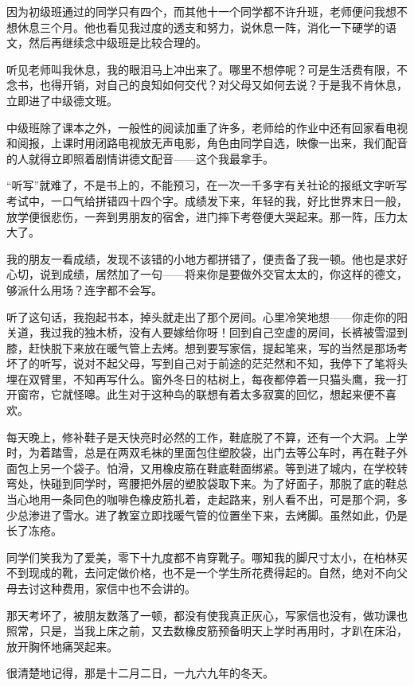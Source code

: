 \par 因为初级班通过的同学只有四个，而其他十一个同学都不许升班，老师便问我想不想休息三个月。他也看见我过度的透支和努力，说休息一阵，消化一下硬学的语文，然后再继续念中级班是比较合理的。
\par 听见老师叫我休息，我的眼泪马上冲出来了。哪里不想停呢？可是生活费有限，不念书，也得开销，对自己的良知如何交代？对父母又如何去说？于是我不肯休息，立即进了中级德文班。
\par 中级班除了课本之外，一般性的阅读加重了许多，老师给的作业中还有回家看电视和阅报，上课时用闭路电视放无声电影，角色由同学自选，映像一出来，我们配音的人就得立即照着剧情讲德文配音——这个我最拿手。
\par “听写”就难了，不是书上的，不能预习，在一次一千多字有关社论的报纸文字听写考试中，一口气给拼错四十四个字。成绩发下来，年轻的我，好比世界末日一般，放学便很悲伤，一奔到男朋友的宿舍，进门摔下考卷便大哭起来。那一阵，压力太大了。
\par 我的朋友一看成绩，发现不该错的小地方都拼错了，便责备了我一顿。他也是求好心切，说到成绩，居然加了一句——将来你是要做外交官太太的，你这样的德文，够派什么用场？连字都不会写。
\par 听了这句话，我抱起书本，掉头就走出了那个房间。心里冷笑地想——你走你的阳关道，我过我的独木桥，没有人要嫁给你呀！回到自己空虚的房间，长裤被雪湿到膝，赶快脱下来放在暖气管上去烤。想到要写家信，提起笔来，写的当然是那场考坏了的听写，说对不起父母，写到自己对于前途的茫茫然和不知，我停下了笔将头埋在双臂里，不知再写什么。窗外冬日的枯树上，每夜都停着一只猫头鹰，我一打开窗帘，它就怪嗥。此生对于这种鸟的联想有着太多寂寞的回忆，想起来便不喜欢。
\par 每天晚上，修补鞋子是天快亮时必然的工作，鞋底脱了不算，还有一个大洞。上学时，为着踏雪，总是在两双毛袜的里面包住塑胶袋，出门去等公车时，再在鞋子外面包上另一个袋子。怕滑，又用橡皮筋在鞋底鞋面绑紧。等到进了城内，在学校转弯处，快碰到同学时，弯腰把外层的塑胶袋取下来。为了好面子，那脱了底的鞋总当心地用一条同色的咖啡色橡皮筋扎着，走起路来，别人看不出，可是那个洞，多少总渗进了雪水。进了教室立即找暖气管的位置坐下来，去烤脚。虽然如此，仍是长了冻疮。
\par 同学们笑我为了爱美，零下十九度都不肯穿靴子。哪知我的脚尺寸太小，在柏林买不到现成的靴，去问定做价格，也不是一个学生所花费得起的。自然，绝对不向父母去讨这种费用，家信中也不会讲的。
\par 那天考坏了，被朋友数落了一顿，都没有使我真正灰心，写家信也没有，做功课也照常，只是，当我上床之前，又去数橡皮筋预备明天上学时再用时，才趴在床沿，放开胸怀地痛哭起来。
\par 很清楚地记得，那是十二月二日，一九六九年的冬天。
